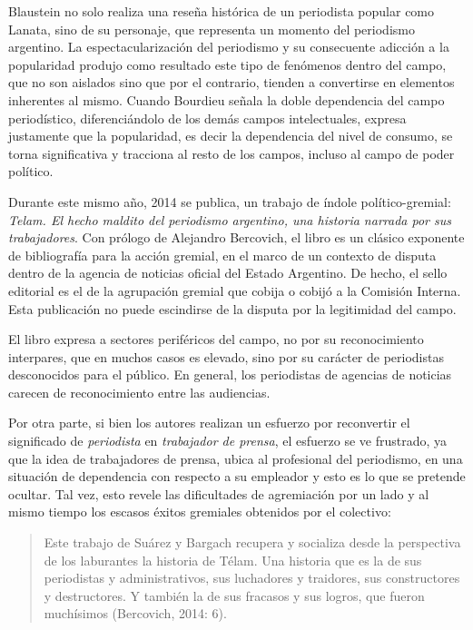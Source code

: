 Blaustein no solo realiza una reseña histórica de un periodista popular como Lanata, sino de su personaje, que representa un momento del periodismo argentino. La espectacularización del periodismo y su consecuente adicción a la popularidad produjo como resultado este tipo de fenómenos dentro del campo, que no son aislados sino que por el contrario, tienden a convertirse en elementos inherentes al mismo. Cuando Bourdieu señala la doble dependencia del campo periodístico, diferenciándolo de los demás campos intelectuales, expresa justamente que la popularidad, es decir la dependencia del nivel de consumo, se torna significativa y tracciona al resto de los campos, incluso al campo de poder político.

Durante este mismo año, 2014 se publica, un trabajo de índole político-gremial: \emph{Telam. El hecho maldito del periodismo argentino, una historia narrada por sus trabajadores}. Con prólogo de Alejandro Bercovich, el libro es un clásico exponente de bibliografía para la acción gremial, en el marco de un contexto de disputa dentro de la agencia de noticias oficial del Estado Argentino. De hecho, el sello editorial es el de la agrupación gremial que cobija o cobijó a la Comisión Interna. Esta publicación no puede escindirse de la disputa por la legitimidad del campo.

El libro expresa a sectores periféricos del campo, no por su reconocimiento interpares, que en muchos casos es elevado, sino por su carácter de periodistas desconocidos para el público. En general, los periodistas de agencias de noticias carecen de reconocimiento entre las audiencias.

Por otra parte, si bien los autores realizan un esfuerzo por reconvertir el significado de \emph{periodista} en \emph{trabajador de prensa}, el esfuerzo se ve frustrado, ya que la idea de trabajadores de prensa, ubica al profesional del periodismo, en una situación de dependencia con respecto a su empleador y esto es lo que se pretende ocultar. Tal vez, esto revele las dificultades de agremiación por un lado y al mismo tiempo los escasos éxitos gremiales obtenidos por el colectivo:

\begin{quote}
Este trabajo de Suárez y Bargach recupera y socializa desde la perspectiva de los laburantes la historia de Télam. Una historia que es la de sus periodistas y administrativos, sus luchadores y traidores, sus constructores y destructores. Y también la de sus fracasos y sus logros, que fueron muchísimos (Bercovich, 2014: 6).
\end{quote}

